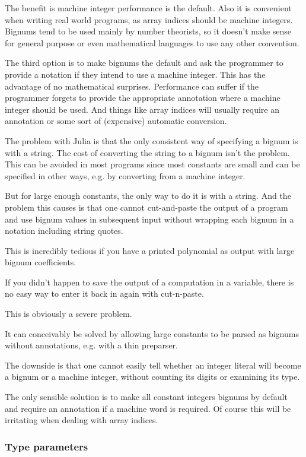 \documentclass[a4paper,10pt]{article}
\begin{document}
The benefit is machine integer performance is the default. Also it is convenient when writing real
world programs, as array indices should be machine integers. Bignums tend to be used mainly by
number theorists, so it doesn't make sense for general purpose or even mathematical languages to
use any other convention.

The third option is to make bignums the default and ask the programmer to provide a notation if they
intend to use a machine integer. This has the advantage of no mathematical surprises. Performance can
suffer if the programmer forgets to provide the appropriate annotation where a machine integer should
be used. And things like array indices will usually require an annotation or some sort of (expensive)
automatic conversion.

The problem with Julia is that the only consistent way of specifying a bignum is with a string. The
cost of converting the string to a bignum isn't the problem. This can be avoided in most programs
since most constants are small and can be specified in other ways, e.g. by converting from a machine
integer.

But for large enough constants, the only way to do it is with a string. And the problem this causes
is that one cannot cut-and-paste the output of a program and use bignum values in subsequent input
without wrapping each bignum in a notation including string quotes.

This is incredibly tedious if you have a printed polynomial as output with large bignum coefficients.

If you didn't happen to save the output of a computation in a variable, there is no easy way to enter
it back in again with cut-n-paste. 

This is obviously a severe problem. 

It can conceivably be solved by allowing large constants to be parsed as bignums without annotations,
e.g. with a thin preparser.

The downside is that one cannot easily tell whether an integer literal will become a bignum or a
machine integer, without counting its digits or examining its type.

The only sensible solution is to make all constant integers bignums by default and require an
annotation if a machine word is required. Of course this will be irritating when dealing with array
indices.

\subsubsection{Type parameters}
\end{document}
